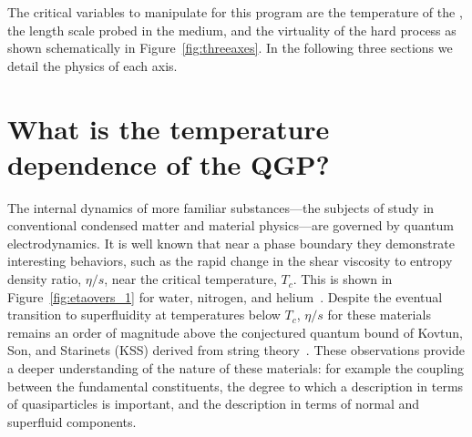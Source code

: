 
The critical variables to manipulate for this program are the temperature of
the \qgp, the length scale probed in the medium, and the virtuality of
the hard process as shown schematically in Figure~\ref{fig:threeaxes}.
In the following three sections we detail the physics of each axis.

\section{What is the temperature dependence of the QGP?}
\label{sec:temperature_dependence}

The internal dynamics of more familiar substances---the subjects of
study in conventional condensed matter and material physics---are
governed by quantum electrodynamics.  It is well known that near a
phase boundary they demonstrate interesting behaviors, such as the
rapid change in the shear viscosity to entropy density ratio,
$\eta/s$, near the critical temperature, $T_c$. This is shown in
Figure~\ref{fig:etaovers_1} for water, nitrogen, and
helium~\cite{Csernai:2006zz}.  Despite the eventual transition to
superfluidity at temperatures below $T_{c}$, $\eta/s$ for these
materials remains an order of magnitude above the conjectured quantum
bound of Kovtun, Son, and Starinets (KSS) derived from string
theory~\cite{Kovtun:2004de}.  These observations provide a deeper
understanding of the nature of these materials: for example the
coupling between the fundamental constituents, the degree to which a
description in terms of quasiparticles is important, and the
description in terms of normal and superfluid components.

